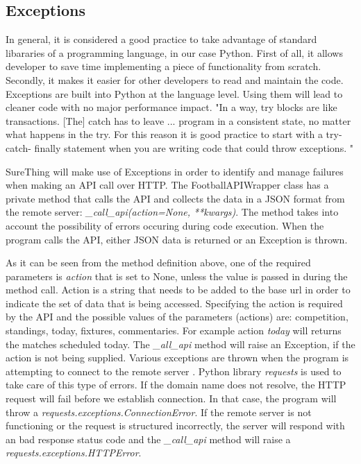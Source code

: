  \subsection{Exceptions}
In general, it is considered a good practice to take advantage of standard libararies of a programming language, in our case Python. First of all, it allows developer to save time implementing a piece of functionality from scratch. Secondly, it makes it easier for other developers to read and maintain the code. Exceptions are built into Python at the language level. Using them will lead to cleaner code with no major performance impact. "In a way, try blocks are like transactions. [The] catch has to leave ... program in a consistent state, no matter what happens in the try. For this reason it is good practice to start with a try- catch- finally statement when you are writing code that could throw exceptions. "\cite{book:martin2011robert}
 
SureThing will make use of Exceptions in order to identify and manage failures when making an API call over HTTP. The FootballAPIWrapper class has a private method that calls the API and collects the data in a JSON format from the remote server: \emph{\_call\_api(action=None, **kwargs)}. The method takes into account the possibility of errors occuring during code execution. When the program calls the API, either JSON data is returned or an Exception is thrown. 

As it can be seen from the method definition above, one of the required parameters is \emph{action} that is set to None, unless the value is passed in during the method call. Action is a string that needs to be added to the base url in order to indicate the set of data that is being accessed. Specifying the action is required by the API and the possible values of the parameters (actions) are: competition, standings, today, fixtures, commentaries. For example action \emph{today} will returns the matches scheduled today. The \emph{\_all\_api} method will raise an Exception, if the action is not being supplied. Various exceptions are thrown when the program is attempting to connect to the remote server \cite{article:httpRequestsExceptions}. Python library \emph{requests} is used to take care of this type of errors. \cite{documentation:PythonRequests} If the domain name does not resolve, the HTTP request will fail before we establish connection. In that case, the program will throw a \emph{requests.exceptions.ConnectionError}. If the remote server is not functioning or the request is structured incorrectly, the server will respond with an bad response status code and the \emph{\_call\_api} method will raise a \emph{requests.exceptions.HTTPError}.

